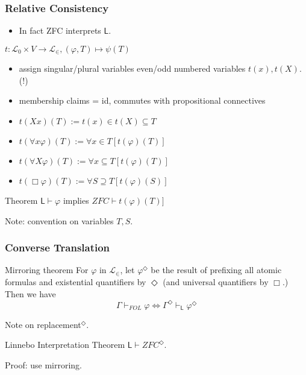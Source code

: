 \documentclass{beamer}
\begin{document}
\begin{frame}
    \frametitle{Relative Consistency}
\begin{itemize}
    \item In fact ZFC interprets $\mathsf{L}$.
\end{itemize}
\begin{block}{$t : \mathcal{L}_0 \times V \to \mathcal{L}_\in, (\varphi, T) \mapsto \psi(T)$}
    \begin{itemize}
        \item<3-> assign singular/plural variables even/odd numbered variables $t(x), t(X)$. (!)
        \item<4-> membership claims = id, commutes with propositional connectives
        \item<5-> $t(Xx)(T) := t(x) \in t(X) \subseteq T$
        \item<6-> $t(\forall x \varphi)(T) := \forall x \in T [t(\varphi)(T)]$
        \item<7-> $t(\forall X \varphi)(T) := \forall x \subseteq T [t(\varphi)(T)]$
        \item<8-> $t(\Box \varphi)(T) := \forall S \supseteq T [t(\varphi)(S)]$
    \end{itemize}
\end{block}
\begin{block}{Theorem}
  $\mathsf{L} \vdash \varphi$ implies $ZFC \vdash t(\varphi)(T)]$  
\end{block}
 Note: convention on variables $T, S$.
\end{frame}
\begin{frame}
    \frametitle{Converse Translation}
\begin{block}{Mirroring theorem}
 For $\varphi$ in $\mathcal{L}_\in$, let $\varphi^\Diamond$ be the result of 
prefixing all atomic formulas and existential quantifiers by $\Diamond$
(and universal quantifiers by $\Box$.) Then we have 
\[
    \Gamma \vdash_{FOL} \varphi 
    \Leftrightarrow 
    \Gamma^\Diamond \vdash_{\mathsf{L}} \varphi^\Diamond
\]
\end{block}
 Note on replacement$^\Diamond$.
\begin{block}{Linnebo Interpretation Theorem}
  $\mathsf{L} \vdash ZFC^\Diamond$.  
\end{block}
 Proof: use mirroring.
\end{frame}
\end{document}
